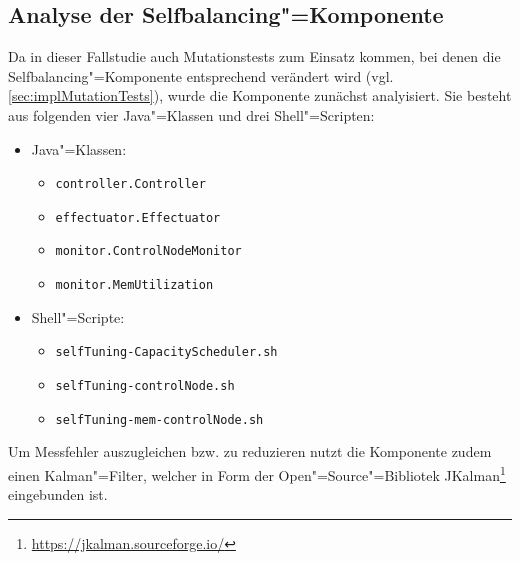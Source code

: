 \subsection{Analyse der Selfbalancing"=Komponente}\label{sec:selfbalancingAnalysis}

Da in dieser Fallstudie auch Mutationstests zum Einsatz kommen, bei denen die Selfbalancing"=Komponente entsprechend verändert wird (vgl. \autoref{sec:implMutationTests}), wurde die Komponente zunächst analyisiert.
Sie besteht aus folgenden vier Java"=Klassen und drei Shell"=Scripten:

\begin{itemize}
    \item Java"=Klassen:
    \begin{itemize}
        \item \texttt{controller.Controller}
        \item \texttt{effectuator.Effectuator}
        \item \texttt{monitor.ControlNodeMonitor}
        \item \texttt{monitor.MemUtilization}
    \end{itemize}
    \item Shell"=Scripte:
    \begin{itemize}
        \item \texttt{selfTuning-CapacityScheduler.sh}
        \item \texttt{selfTuning-controlNode.sh}
        \item \texttt{selfTuning-mem-controlNode.sh}
    \end{itemize}
\end{itemize}

Um Messfehler auszugleichen bzw. zu reduzieren nutzt die Komponente zudem einen Kalman"=Filter, welcher in Form der Open"=Source"=Bibliotek JKalman\footnote{\url{https://jkalman.sourceforge.io/}} eingebunden ist.


